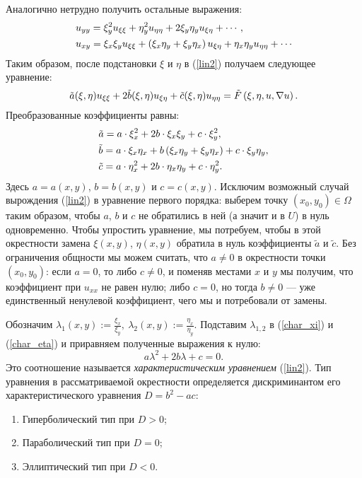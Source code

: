     Аналогично нетрудно получить остальные выражения:
    \begin{align*}
        & u_{yy} = \xi_y^2 u_{\xi\xi} + \eta_y^2 u_{\eta\eta} + 2 \xi_y\eta_y u_{\xi\eta} + \cdots,\\
        & u_{xy} = \xi_x\xi_y u_{\xi\xi} + \left({\xi_x\eta_y + \xi_y\eta_x}\right)u_{\xi\eta} + \eta_x\eta_yu_{\eta\eta} + \cdots
    \end{align*}
    Таким образом, после подстановки $\xi$ и $\eta$ в (\ref{lin2}) получаем следующее уравнение:
    \begin{equation*}
        \tilde{a}(\xi, \eta) u_{\xi\xi} + 2\tilde{b}(\xi, \eta)u_{\xi\eta} + \tilde{c}(\xi, \eta)u_{\eta\eta} = \tilde{F}\left({\xi, \eta, u, \nabla u}\right).
    \end{equation*}
    Преобразованные коэффициенты равны:
    \begin{align}
        & \tilde{a} = a\cdot\xi_x^2 + 2b\cdot\xi_x\xi_y + c\cdot\xi_y^2,\label{char_xi}\\
        & \tilde{b} = a\cdot\xi_x\eta_x + b\left({\xi_x\eta_y +\xi_y\eta_x}\right) + c\cdot\xi_y\eta_y, \notag \\
        & \tilde{c} = a\cdot\eta_x^2 + 2b\cdot\eta_x\eta_y + c\cdot\eta_y^2. \label{char_eta}
    \end{align}
    Здесь $a = a(x, y)$, $b = b(x, y)$ и $c = c(x, y)$. Исключим возможный случай вырождения (\ref{lin2}) в уравнение первого порядка: выберем точку
    $(x_0, y_0) \in \Omega$ таким образом, чтобы $a$, $b$ и $c$ не обратились в ней
    (а значит и в $U$) в нуль одновременно. Чтобы упростить уравнение, мы потребуем, чтобы в этой окрестности замена $\xi(x, y)$, $\eta(x,y)$ обратила
    в нуль коэффициенты $\tilde{a}$ и $\tilde{c}$. Без ограничения общности мы можем считать, что $a \not= 0$ в окрестности точки $(x_0, y_0)$:
    если $a = 0$, то либо $c \not= 0$, и поменяв местами $x$ и $y$ мы получим, что коэффициент при $u_{xx}$ не равен нулю; либо $c = 0$, но тогда
    $b \not= 0$ --- уже единственный ненулевой коэффициент, чего мы и потребовали от замены.
    
    Обозначим $\lambda_1(x,y) := \frac{\xi_x}{\xi_y},\: \lambda_2(x, y) := \frac{\eta_x}{\eta_y}$. Подставим $\lambda_{1,2}$ в (\ref{char_xi})
    и (\ref{char_eta}) и приравняем полученные выражения к нулю:
    \begin{equation}
        a \lambda^2 + 2b\lambda + c = 0. \label{char_2ord_general}
    \end{equation}
    Это соотношение называется \textit{характеристическим уравнением} (\ref{lin2}). Тип уравнения в рассматриваемой окрестности определяется дискриминантом
    его характеристического уравнения $D = b^2 - ac$:
    \begin{enumerate}
        \item Гиперболический тип при $D > 0$;
        \item Параболический тип при $D = 0$;
        \item Эллиптический тип при $D < 0$.
    \end{enumerate}

